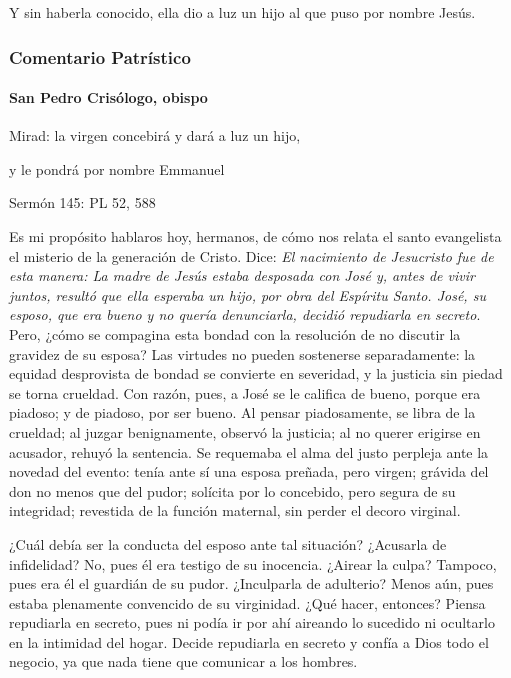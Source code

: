 \documentclass[]{article}
\let\oldparagraph\paragraph
\renewcommand{\paragraph}[1]{\oldparagraph{#1}\mbox{}}
\begin{document}
Y sin haberla conocido, ella dio a luz un hijo al que puso por nombre
Jesús.



\protect\hypertarget{_Toc448662772}{}{\protect\hypertarget{_Toc448690291}{}{}}

\subsubsection{Comentario Patrístico}\label{comentario-patruxedstico-4}

\paragraph{San Pedro Crisólogo,
obispo}\label{san-pedro-crisuxf3logo-obispo}

Mirad: la virgen concebirá y dará a luz un hijo,

y le pondrá por nombre Emmanuel

Sermón 145: PL 52, 588

Es mi propósito hablaros hoy, hermanos, de cómo nos relata el santo
evangelista el misterio de la generación de Cristo. Dice: \emph{El
nacimiento de Jesucristo fue de esta manera: La madre de Jesús estaba
desposada con José y, antes de vivir juntos, resultó que ella esperaba
un hijo, por obra del Espíritu Santo. José, su esposo, que era bueno y
no quería denunciarla, decidió repudiarla en secreto}. Pero, ¿cómo se
compagina esta bondad con la resolución de no discutir la gravidez de su
esposa? Las virtudes no pueden sostenerse separadamente: la equidad
desprovista de bondad se convierte en severidad, y la justicia sin
piedad se torna crueldad. Con razón, pues, a José se le califica de
bueno, porque era piadoso; y de piadoso, por ser bueno. Al pensar
piadosamente, se libra de la crueldad; al juzgar benignamente, observó
la justicia; al no querer erigirse en acusador, rehuyó la sentencia. Se
requemaba el alma del justo perpleja ante la novedad del evento: tenía
ante sí una esposa preñada, pero virgen; grávida del don no menos que
del pudor; solícita por lo concebido, pero segura de su integridad;
revestida de la función maternal, sin perder el decoro virginal.

¿Cuál debía ser la conducta del esposo ante tal situación? ¿Acusarla de
infidelidad? No, pues él era testigo de su inocencia. ¿Airear la culpa?
Tampoco, pues era él el guardián de su pudor. ¿Inculparla de adulterio?
Menos aún, pues estaba plenamente convencido de su virginidad. ¿Qué
hacer, entonces? Piensa repudiarla en secreto, pues ni podía ir por ahí
aireando lo sucedido ni ocultarlo en la intimidad del hogar. Decide
repudiarla en secreto y confía a Dios todo el negocio, ya que nada tiene
que comunicar a los hombres.
\end{document}
